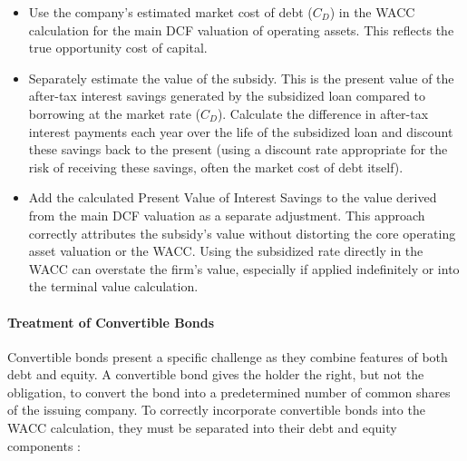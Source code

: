 \begin{itemize}
          \begin{itemize}
              \item Use the company's estimated market cost of debt (\(C_D\)) in the WACC calculation for the main DCF valuation of operating assets. This reflects the true opportunity cost of capital.
              \item Separately estimate the value of the subsidy. This is the present value of the after-tax interest savings generated by the subsidized loan compared to borrowing at the market rate (\(C_D\)). Calculate the difference in after-tax interest payments each year over the life of the subsidized loan and discount these savings back to the present (using a discount rate appropriate for the risk of receiving these savings, often the market cost of debt itself).
              \item Add the calculated Present Value of Interest Savings to the value derived from the main DCF valuation as a separate adjustment. This approach correctly attributes the subsidy's value without distorting the core operating asset valuation or the WACC. Using the subsidized rate directly in the WACC can overstate the firm's value, especially if applied indefinitely or into the terminal value calculation.
          \end{itemize}
\end{itemize}

\paragraph{Treatment of Convertible Bonds} \label{par:convertible_bonds}
Convertible bonds present a specific challenge as they combine features of both debt and equity. A convertible bond gives the holder the right, but not the obligation, to convert the bond into a predetermined number of common shares of the issuing company. To correctly incorporate convertible bonds into the WACC calculation, they must be separated into their debt and equity components \parencite{brealey2020principles}:


